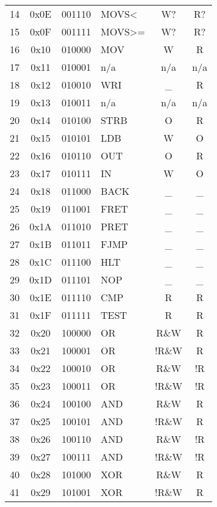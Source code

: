 \documentclass[oneside, a4paper]{memoir}
\begin{document}
\begin{center}
\begin{longtable}{ccclcc}
14 & 0x0E & 001110 & MOVS<           & W?    & R?  \\
15 & 0x0F & 001111 & MOVS>=          & W?    & R?  \\
16 & 0x10 & 010000 & MOV             & W     & R   \\
17 & 0x11 & 010001 & n/a             & n/a   & n/a \\
18 & 0x12 & 010010 & WRI             & \_    & R   \\
19 & 0x13 & 010011 & n/a             & n/a   & n/a \\
20 & 0x14 & 010100 & STRB            & O     & R   \\
21 & 0x15 & 010101 & LDB             & W     & O   \\
22 & 0x16 & 010110 & OUT             & O     & R   \\
23 & 0x17 & 010111 & IN              & W     & O   \\
24 & 0x18 & 011000 & BACK            & \_    & \_  \\
25 & 0x19 & 011001 & FRET            & \_    & \_  \\
26 & 0x1A & 011010 & PRET            & \_    & \_  \\
27 & 0x1B & 011011 & FJMP            & \_    & \_  \\
28 & 0x1C & 011100 & HLT             & \_    & \_  \\
29 & 0x1D & 011101 & NOP             & \_    & \_  \\
30 & 0x1E & 011110 & CMP             & R     & R   \\
31 & 0x1F & 011111 & TEST            & R     & R   \\
32 & 0x20 & 100000 & OR              & R\&W  & R   \\
33 & 0x21 & 100001 & OR              & !R\&W & R   \\
34 & 0x22 & 100010 & OR              & R\&W  & !R  \\
35 & 0x23 & 100011 & OR              & !R\&W & !R  \\
36 & 0x24 & 100100 & AND             & R\&W  & R   \\
37 & 0x25 & 100101 & AND             & !R\&W & R   \\
38 & 0x26 & 100110 & AND             & R\&W  & !R  \\
39 & 0x27 & 100111 & AND             & !R\&W & !R  \\
40 & 0x28 & 101000 & XOR             & R\&W  & R   \\
41 & 0x29 & 101001 & XOR             & !R\&W & R   \\

\end{longtable}
\end{center}
\end{document}
